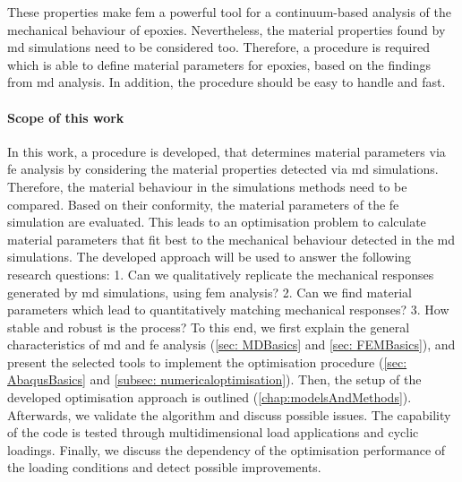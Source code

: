 These properties make \acrshort{fem} a powerful tool for a continuum-based analysis of the mechanical behaviour of epoxies. Nevertheless, the material properties found by \acrshort{md} simulations need to be considered too. Therefore, a procedure is required which is able to define material parameters for epoxies, based on the findings from \acrshort{md} analysis.
In addition, the procedure should be easy to handle and fast.
\paragraph{Scope of this work}
In this work, a procedure is developed, that determines material parameters via \acrshort{fe} analysis by considering the material properties detected via \acrshort{md} simulations. Therefore, the material behaviour in the simulations methods need to be compared.
Based on their conformity, the material parameters of the \acrshort{fe} simulation are evaluated.
This leads to an optimisation problem to calculate material parameters that fit best to the mechanical behaviour detected in the \acrshort{md} simulations.
The developed approach will be used to answer the following research questions: 1. Can we qualitatively replicate the mechanical responses generated by \acrshort{md} simulations, using \acrshort{fem} analysis? 2. Can we find material parameters which lead to quantitatively matching mechanical responses? 3. How stable and robust is the process? To this end, we first explain the general characteristics of \acrshort{md} and \acrshort{fe} analysis (\autoref{sec: MDBasics} and \autoref{sec: FEMBasics}), and present the selected tools to implement the optimisation procedure (\autoref{sec: AbaqusBasics} and \autoref{subsec: numericaloptimisation}). Then, the setup of the developed optimisation approach is outlined (\autoref{chap:modelsAndMethods}). Afterwards, we validate the algorithm and discuss possible issues. The capability of the code is tested through multidimensional load applications and cyclic loadings. Finally, we discuss the dependency of the optimisation performance of the loading conditions and detect possible improvements.






